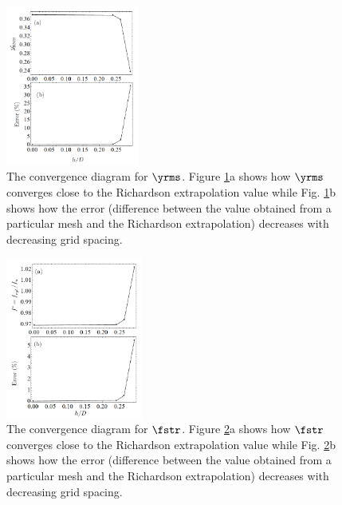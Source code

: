 \documentclass[a4paper,fleqn]{cas-sc}
\begin{document}
\begin{figure}
  \centering
  \includegraphics[width=0.39\textwidth]{figs/figure7}
  \caption{The convergence diagram for $\yrms$. Figure \ref{fig:yrmsGCI}a shows how $\yrms$ converges close to the Richardson extrapolation value while Fig. \ref{fig:yrmsGCI}b shows how the error (difference between the value obtained from a particular mesh and the Richardson extrapolation) decreases with decreasing grid spacing.} \label{fig:yrmsGCI}
\end{figure}

\begin{figure}
  \centering
  \includegraphics[width=0.4\textwidth]{figs/figure8}
  \caption{The convergence diagram for $\fstr$. Figure \ref{fig:fstrGCI}a shows how $\fstr$ converges close to the Richardson extrapolation value while Fig. \ref{fig:fstrGCI}b shows how the error (difference between the value obtained from a particular mesh and the Richardson extrapolation) decreases with decreasing grid spacing.} \label{fig:fstrGCI}
\end{figure}
\end{document}
